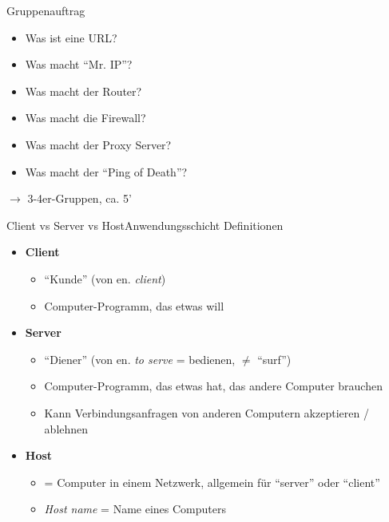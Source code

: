 \begin{frame}[fragile]{Gruppenauftrag}
\begin{myexercise}
\begin{itemize}
\item Was ist eine URL?
\item Was macht ``Mr. IP''?
\item Was macht der Router?
\item Was macht die Firewall?
\item Was macht der Proxy Server? 
\item Was macht der ``Ping of Death''? \faSkull
\end{itemize}
$\rightarrow$ 3-4er-Gruppen, ca. 5'
\end{myexercise}
\end{frame}


\begin{frame}[fragile]{\faLaptop{} Client vs Server vs Host}{Anwendungsschicht}
Definitionen
\begin{itemize}[<+->]
\item \textbf{Client}
\begin{itemize}
\item ``Kunde'' (von en. \textit{client})
\item Computer-Programm, das etwas will
\end{itemize}
\item \textbf{Server}
\begin{itemize}
\item ``Diener'' (von en. \textit{to serve} = bedienen, $\neq$ ``surf'')
\item Computer-Programm, das etwas hat, das andere Computer brauchen
\item Kann Verbindungsanfragen von anderen Computern akzeptieren / ablehnen
\end{itemize}
\item \textbf{Host} 
\begin{itemize}
\item = Computer in einem Netzwerk, allgemein für ``server'' oder ``client''
\item \textit{Host name} = Name eines Computers
\end{itemize}

\end{itemize}
\end{frame}

